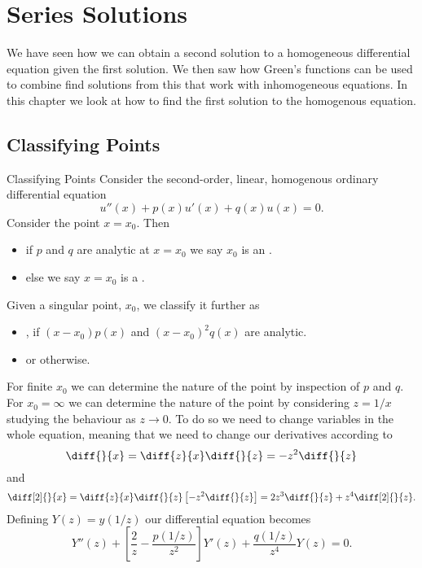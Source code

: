 \documentclass[fleqn]{NotesClass}
\begin{document}
    \chapter{Series Solutions}
    We have seen how we can obtain a second solution to a homogeneous differential equation given the first solution.
    We then saw how Green's functions can be used to combine find solutions from this that work with inhomogeneous equations.
    In this chapter we look at how to find the first solution to the homogenous equation.
    
    \section{Classifying Points}
    \begin{dfn}{Classifying Points}{}
        Consider the second-order, linear, homogenous ordinary differential equation
        \begin{equation}
            u''(x) + p(x)u'(x) + q(x)u(x) = 0.
        \end{equation}
        Consider the point \(x = x_0\).
        Then
        \begin{itemize}
            \item if \(p\) and \(q\) are analytic at \(x = x_0\) we say \(x_0\) is an .
            \item else we say \(x = x_0\) is a .
        \end{itemize}
        Given a singular point, \(x_0\), we classify it further as
        \begin{itemize}
            \item {}, if \((x - x_0)p(x)\) and \((x - x_0)^2q(x)\) are analytic.
            \item {} or  otherwise.
        \end{itemize}
    \end{dfn}
    
    For finite \(x_0\) we can determine the nature of the point by inspection of \(p\) and \(q\).
    For \(x_0 = \infty\) we can determine the nature of the point by considering \(z = 1/x\) studying the behaviour as \(z \to 0\).
    To do so we need to change variables in the whole equation, meaning that we need to change our derivatives according to
    \begin{equation}
        \diff{}{x} = \diff{z}{x}\diff{}{z} = -z^2\diff{}{z}
    \end{equation}
    and
    \begin{equation}
        \diff[2]{}{x} = \diff{z}{x}\diff{}{z}\left[ -z^2\diff{}{z} \right] = 2z^3\diff{}{z} + z^4\diff[2]{}{z}.
    \end{equation}
    Defining \(Y(z) = y(1/z)\) our differential equation becomes
    \begin{equation}
        Y''(z) + \left[ \frac{2}{z} - \frac{p(1/z)}{z^2} \right]Y'(z) + \frac{q(1/z)}{z^4}Y(z) = 0.
    \end{equation}
    
\end{document}
